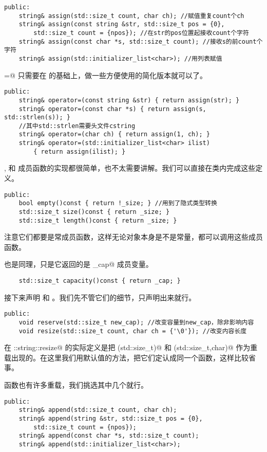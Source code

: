 \begin{lstlisting}
public:
    string& assign(std::size_t count, char ch); //赋值重复count个ch
    string& assign(const string &str, std::size_t pos = {0},
        std::size_t count = {npos}); //在str的pos位置起接收count个字符
    string& assign(const char *s, std::size_t count); //接收s的前count个字符
    string& assign(std::initializer_list<char>); //用列表赋值
\end{lstlisting}
\lstinline@operator=@ 只需要在 \lstinline@assign@ 的基础上，做一些方便使用的简化版本就可以了。
\begin{lstlisting}
public:
    string& operator=(const string &str) { return assign(str); }
    string& operator=(const char *s) { return assign(s, std::strlen(s)); }
    //其中std::strlen需要头文件cstring
    string& operator=(char ch) { return assign(1, ch); }
    string& operator=(std::initializer_list<char> ilist)
        { return assign(ilist); }
\end{lstlisting}\par
\lstinline@empty@, \lstinline@size@ 和 \lstinline@length@ 成员函数的实现都很简单，也不太需要讲解。我们可以直接在类内完成这些定义。
\begin{lstlisting}
public:
    bool empty()const { return !_size; } //用到了隐式类型转换
    std::size_t size()const { return _size; } 
    std::size_t length()const { return _size; }
\end{lstlisting}
注意它们都要是常成员函数，这样无论对象本身是不是常量，都可以调用这些成员函数。\par
\lstinline@capacity@ 也是同理，只是它返回的是 \lstinline@_cap@ 成员变量。
\begin{lstlisting}
    std::size_t capacity()const { return _cap; }
\end{lstlisting}\par
接下来声明 \lstinline@reserve@ 和 \lstinline@resize@。我们先不管它们的细节，只声明出来就行。
\begin{lstlisting}
public:
    void reserve(std::size_t new_cap); //改变容量到new_cap，除非影响内容
    void resize(std::size_t count, char ch = {'\0'}); //改变内容长度
\end{lstlisting}
在 \lstinline@std::string::resize@ 的实际定义是把 \lstinline@(std::size_t)@ 和 \lstinline@(std::size_t,char)@ 作为重载出现的。在这里我们用默认值的方法，把它们定认成同一个函数，这样比较省事。\par
\lstinline@append@ 函数也有许多重载，我们挑选其中几个就行。
\begin{lstlisting}
public:
    string& append(std::size_t count, char ch);
    string& append(string &str, std::size_t pos = {0},
        std::size_t count = {npos});
    string& append(const char *s, std::size_t count);
    string& append(std::initializer_list<char>);
\end{lstlisting}\par
